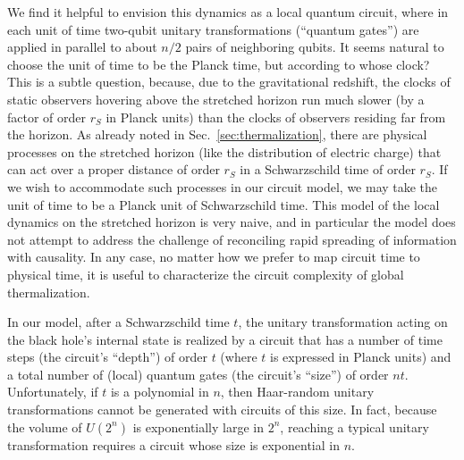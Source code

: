 \documentclass[11pt]{article}
\begin{document}
We find it helpful to envision this dynamics as a local quantum circuit, where in each unit of time two-qubit unitary transformations (``quantum gates'') are applied in parallel to about $n/2$ pairs of neighboring qubits. It seems natural to choose the unit of time to be the Planck time, but according to whose clock? This is a subtle question, because, due to the gravitational redshift, the clocks of static observers hovering above the stretched horizon run much slower (by a factor of order $r_S$ in Planck units) than the clocks of observers residing far from the horizon. As already noted in Sec.~\ref{sec:thermalization}, there are physical processes on the stretched horizon (like the distribution of electric charge) that can act over a proper distance of order $r_S$ in a Schwarzschild time of order $r_S$. If we wish to accommodate such processes in our circuit model, we may take the unit of time to be a Planck unit of Schwarzschild time. This model of the local dynamics on the stretched horizon is very naive, and in particular the model does not attempt to address the challenge of reconciling rapid spreading of information with causality. In any case, no matter how we prefer to map circuit time to physical time, it is useful to characterize the circuit complexity of global thermalization. 

In our model, after a Schwarzschild time $t$, the unitary transformation acting on the black hole's internal state is realized by a circuit that has a number of time steps (the circuit's ``depth'') of order $t$ (where $t$ is expressed in Planck units) and a total number of (local) quantum gates (the circuit's ``size'') of order $nt$. Unfortunately, if $t$ is a polynomial in $n$, then Haar-random unitary transformations cannot be generated with circuits of this size. In fact, because the volume of $U(2^n)$ is exponentially large in $2^n$, reaching a typical unitary transformation requires a circuit whose size is exponential in $n$. 
\end{document}
